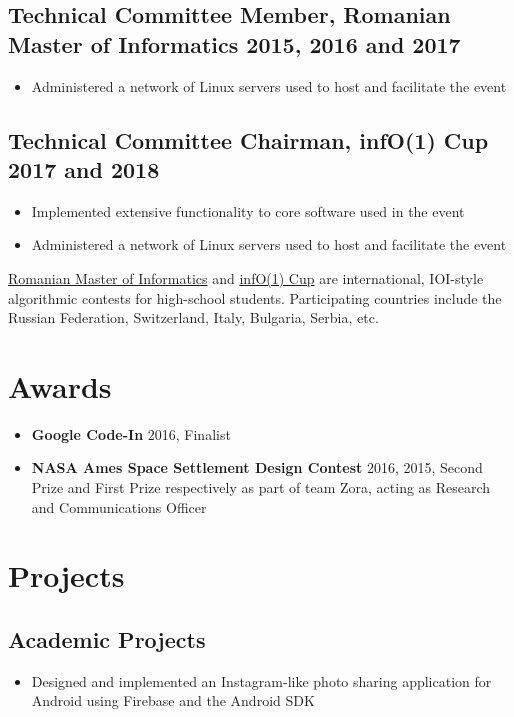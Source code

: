 \documentclass[a4paper]{article}
\begin{document}
\subsection*{Technical Committee Member, Romanian Master of Informatics \hfill
2015, 2016 and 2017}
\begin{itemize}
	\item Administered a network of Linux servers used to host and facilitate
		the event
\end{itemize}

\subsection*{Technical Committee Chairman, infO(1) Cup \hfill 2017 and 2018}
\begin{itemize}
	\item Implemented extensive functionality to core software used in the event
	\item Administered a network of Linux servers used to host and facilitate
		the event
\end{itemize}

\vspace{5pt}
\href{http://rmi.lbi.ro}{Romanian Master of Informatics} and \href{http://info1cup.com/}{infO(1) Cup} are international, IOI-style
algorithmic contests for high-school students. Participating countries include
the Russian Federation, Switzerland, Italy, Bulgaria, Serbia, etc.

\section*{Awards}

\begin{itemize}
	\item \textbf{Google Code-In} 2016, Finalist
	\item \textbf{NASA Ames Space Settlement Design Contest} 2016, 2015, Second Prize and First
		Prize respectively as part of team Zora, acting as Research and
		Communications Officer
\end{itemize}

\section*{Projects}

\subsection*{Academic Projects}
\begin{itemize}
	\item Designed and implemented an Instagram-like photo sharing application
		for Android using Firebase and the Android SDK
\end{itemize}
\end{document}
